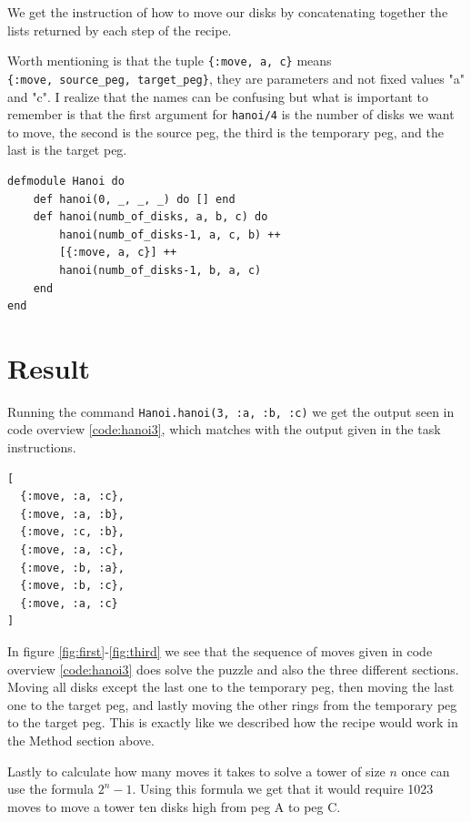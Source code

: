 \documentclass[a4paper,11pt]{article}
\newenvironment{code}{\captionsetup{type=listing}}{}
\begin{document}
We get the instruction of how to move our disks by concatenating together the lists returned by each step of the recipe. 

Worth mentioning is that the tuple {\tt \{:move, a, c\}} means \\{\tt \{:move, source\_peg, target\_peg\}}, they are parameters 
and not fixed values "a" and "c". I realize that the names can be confusing but what is important to remember is that the 
first argument for {\tt hanoi/4} is the number of disks we want to move, the second is the source peg, the third is the temporary 
peg, and the last is the target peg.


\begin{code}
\label{code:hanoi}
\begin{verbatim}
defmodule Hanoi do
    def hanoi(0, _, _, _) do [] end
    def hanoi(numb_of_disks, a, b, c) do
        hanoi(numb_of_disks-1, a, c, b) ++ 
        [{:move, a, c}] ++ 
        hanoi(numb_of_disks-1, b, a, c)
    end
end
\end{verbatim}
\end{code}

\section*{Result}
Running the command {\tt Hanoi.hanoi(3, :a, :b, :c)} we get the output seen in code overview \ref{code:hanoi3}, which matches
with the output given in the task instructions. 

\begin{code}
\label{code:hanoi3}
\begin{verbatim}
[
  {:move, :a, :c},
  {:move, :a, :b},
  {:move, :c, :b},
  {:move, :a, :c},
  {:move, :b, :a},
  {:move, :b, :c},
  {:move, :a, :c}
]
\end{verbatim}
\end{code}
In figure \ref{fig:first}-\ref{fig:third} we see that the sequence of moves given in code overview \ref{code:hanoi3} does solve
the puzzle and also the three different sections. Moving all disks except the last one to the temporary peg, then moving the 
last one to the target peg, and lastly moving the other rings from the temporary peg to the target peg. This is exactly like 
we described how the recipe would work in the Method section above.

Lastly to calculate how many moves it takes to solve a tower of size $n$ once can use the formula $2^n -1$. Using this formula 
we get that it would require 1023 moves to move a tower ten disks high from peg A to peg C.
\end{document}
